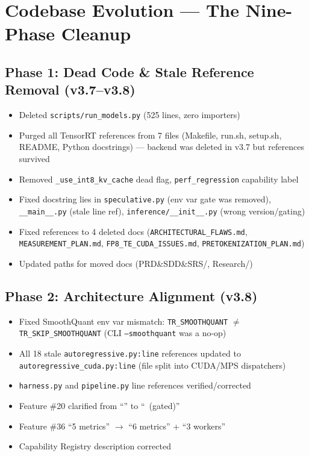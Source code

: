 \documentclass[11pt,a4paper,twoside]{article}
\begin{document}
\section{Codebase Evolution — The Nine-Phase Cleanup}

\subsection{Phase 1: Dead Code \& Stale Reference Removal (v3.7--v3.8)}

\begin{itemize}[nosep]
  \item Deleted \texttt{scripts/run\_models.py} (525 lines, zero importers)
  \item Purged all TensorRT references from 7 files (Makefile, run.sh, setup.sh,
        README, Python docstrings) --- backend was deleted in v3.7 but references
        survived
  \item Removed \texttt{\_use\_int8\_kv\_cache} dead flag, \texttt{perf\_regression}
        capability label
  \item Fixed docstring lies in \texttt{speculative.py} (env var gate was removed),
        \texttt{\_\_main\_\_.py} (stale line ref), \texttt{inference/\_\_init\_\_.py}
        (wrong version/gating)
  \item Fixed references to 4 deleted docs (\texttt{ARCHITECTURAL\_FLAWS.md},
        \texttt{MEASUREMENT\_PLAN.md}, \texttt{FP8\_TE\_CUDA\_ISSUES.md},
        \texttt{PRETOKENIZATION\_PLAN.md})
  \item Updated paths for moved docs (PRD\&SDD\&SRS/, Research/)
\end{itemize}

\subsection{Phase 2: Architecture Alignment (v3.8)}

\begin{itemize}[nosep]
  \item Fixed SmoothQuant env var mismatch: \texttt{TR\_SMOOTHQUANT} $\neq$
        \texttt{TR\_SKIP\_SMOOTHQUANT} (CLI \texttt{---smoothquant} was a no-op)
  \item All 18 stale \texttt{autoregressive.py:line} references updated to
        \texttt{autoregressive\_cuda.py:line} (file split into CUDA/MPS dispatchers)
  \item \texttt{harness.py} and \texttt{pipeline.py} line references verified/corrected
  \item Feature \#20 clarified from ``\checkmark'' to ``\checkmark\ (gated)''
  \item Feature \#36 ``5 metrics'' $\rightarrow$ ``6 metrics'' + ``3 workers''
  \item Capability Registry description corrected
\end{itemize}
\end{document}
